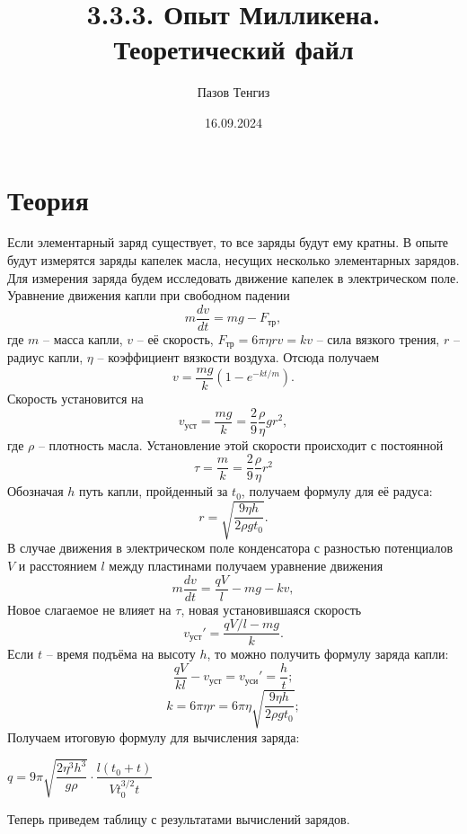 \documentclass[a4paper,12pt]{article}
\author{Пазов Тенгиз}
\title{3.3.3. Опыт Милликена. Теоретический файл}
\date{16.09.2024}
\begin{document}
\maketitle
\newpage 
\section*{Теория}
Если элементарный заряд существует, то все заряды будут ему кратны. В опыте будут измерятся заряды капелек масла, несущих несколько элементарных зарядов.\\
Для измерения заряда будем исследовать движение капелек в электрическом поле. Уравнение движения капли при свободном падении
\begin{equation}
m \dfrac{dv}{dt}=mg-F_{\text{тр}},
\end{equation}
где $m$ -- масса капли, $v$ -- её скорость, $F_{\text{тр}}=6\pi \eta rv = kv$ -- сила вязкого трения, $r$ -- радиус капли, $\eta$ -- коэффициент вязкости воздуха. Отсюда получаем 
\begin{equation}
v = \dfrac{mg}{k}\left(1 - e^{-kt/m}\right).
\end{equation}
Скорость установится на
$$
v_{\text{уст}}=\dfrac{mg}{k}=\dfrac{2}{9}\dfrac{\rho}{\eta}gr^2,
$$
где $\rho$ -- плотность масла. Установление этой скорости происходит с постоянной
$$
\tau = \dfrac{m}{k}=\dfrac{2}{9}\dfrac{\rho}{\eta}r^2
$$
Обозначая $h$ путь капли, пройденный за $t_0$, получаем формулу для её радуса:
\begin{equation}
r = \sqrt{\dfrac{9\eta h}{2\rho gt_0}}.
\end{equation}
В случае движения в электрическом поле конденсатора с разностью потенциалов $V$ и расстоянием $l$ между пластинами получаем уравнение движения
\begin{equation}
m \dfrac{dv}{dt}=\dfrac{qV}{l}-mg-kv,
\end{equation}
Новое слагаемое не влияет на $\tau$, новая установившаяся скорость
$$
v_{\text{уст}}'=\dfrac{qV/l - mg}{k}.
$$
Если $t$ -- время подъёма на высоту $h$, то можно получить формулу заряда капли:
$$
\dfrac{qV}{kl}-v_{\text{уст}}=v_{\text{уси}}'=\dfrac{h}{t};
$$
$$
k=6\pi \eta r  = 6\pi \eta  \sqrt{\dfrac{9\eta h}{2\rho gt_0}};
$$
Получаем итоговую формулу для вычисления заряда:
\begin{center}
$q = 9\pi \sqrt{\dfrac{2\eta^3 h^3}{g\rho}}\cdot \dfrac{l(t_0+t)}{Vt^{3/2}_0t}$
\end{center}
Теперь приведем таблицу с результатами вычислений зарядов.
\end{document}
